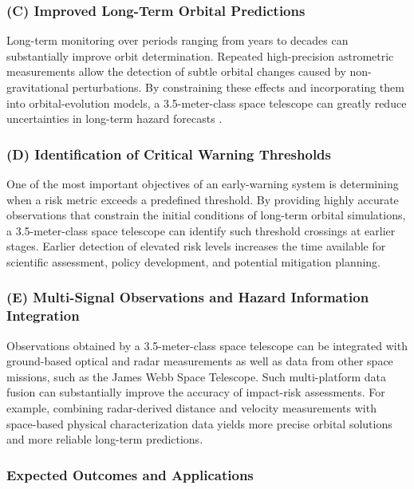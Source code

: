 \subsubsection{(C) Improved Long-Term Orbital Predictions}\label{c-improved-long-term-orbital-predictions}

Long-term monitoring over periods ranging from years to decades can substantially improve orbit determination. Repeated high-precision astrometric measurements allow the detection of subtle orbital changes caused by non-gravitational perturbations. By constraining these effects and incorporating them into orbital-evolution models, a 3.5-meter-class space telescope can greatly reduce uncertainties in long-term hazard forecasts \cite{vokrouhlicky2015}.

\subsubsection{(D) Identification of Critical Warning Thresholds}\label{d-identification-of-critical-warning-thresholds}

One of the most important objectives of an early-warning system is determining when a risk metric exceeds a predefined threshold. By providing highly accurate observations that constrain the initial conditions of long-term orbital simulations, a 3.5-meter-class space telescope can identify such threshold crossings at earlier stages. Earlier detection of elevated risk levels increases the time available for scientific assessment, policy development, and potential mitigation planning.

\subsubsection{(E) Multi-Signal Observations and Hazard Information Integration}\label{e-multi-signal-observations-and-hazard-information-integration}

Observations obtained by a 3.5-meter-class space telescope can be integrated with ground-based optical and radar measurements as well as data from other space missions, such as the James Webb Space Telescope. Such multi-platform data fusion can substantially improve the accuracy of impact-risk assessments. For example, combining radar-derived distance and velocity measurements with space-based physical characterization data yields more precise orbital solutions and more reliable long-term predictions.

\subsubsection{Expected Outcomes and Applications}

